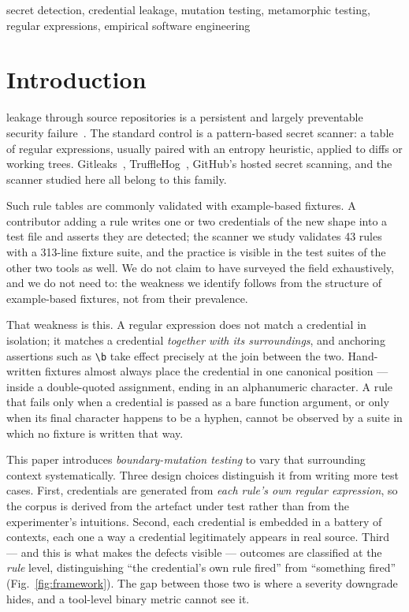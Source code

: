 \documentclass[journal]{IEEEtran}
\begin{document}
\begin{IEEEkeywords}
secret detection, credential leakage, mutation testing, metamorphic testing, regular expressions, empirical software engineering
\end{IEEEkeywords}

\section{Introduction}

 leakage through source repositories is a persistent and largely preventable security failure~\cite{meli2019}. The standard control is a pattern-based secret scanner: a table of regular expressions, usually paired with an entropy heuristic, applied to diffs or working trees. Gitleaks~\cite{gitleaks}, TruffleHog~\cite{trufflehog}, GitHub's hosted secret scanning, and the scanner studied here all belong to this family.

Such rule tables are commonly validated with example-based fixtures. A contributor adding a rule writes one or two credentials of the new shape into a test file and asserts they are detected; the scanner we study validates 43 rules with a 313-line fixture suite, and the practice is visible in the test suites of the other two tools as well. We do not claim to have surveyed the field exhaustively, and we do not need to: the weakness we identify follows from the structure of example-based fixtures, not from their prevalence.

That weakness is this. A regular expression does not match a credential in isolation; it matches a credential \emph{together with its surroundings}, and anchoring assertions such as \verb|\b| take effect precisely at the join between the two. Hand-written fixtures almost always place the credential in one canonical position --- inside a double-quoted assignment, ending in an alphanumeric character. A rule that fails only when a credential is passed as a bare function argument, or only when its final character happens to be a hyphen, cannot be observed by a suite in which no fixture is written that way.

This paper introduces \emph{boundary-mutation testing} to vary that surrounding context systematically. Three design choices distinguish it from writing more test cases. First, credentials are generated from \emph{each rule's own regular expression}, so the corpus is derived from the artefact under test rather than from the experimenter's intuitions. Second, each credential is embedded in a battery of contexts, each one a way a credential legitimately appears in real source. Third --- and this is what makes the defects visible --- outcomes are classified at the \emph{rule} level, distinguishing ``the credential's own rule fired'' from ``something fired'' (Fig.~\ref{fig:framework}). The gap between those two is where a severity downgrade hides, and a tool-level binary metric cannot see it.
\end{document}
